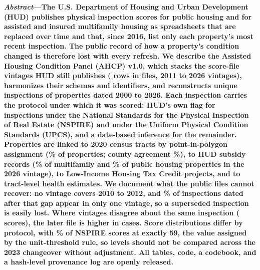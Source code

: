 \documentclass[10pt,twocolumn,letterpaper]{article}
\begin{document}

\begingroup
\renewcommand{\thefootnote}{}
\endgroup

\noindent\textbf{\textit{Abstract}---The U.S. Department of Housing and Urban Development (HUD) publishes physical inspection scores for public housing and for assisted and insured multifamily housing as spreadsheets that are replaced over time and that, since 2016, list only each property's most recent inspection. The public record of how a property's condition changed is therefore lost with every refresh. We describe the Assisted Housing Condition Panel (AHCP) v1.0, which stacks the \nVintages{} score-file vintages HUD still publishes (\SRawRows{} rows in \rawFiles{} files, 2011 to 2026 vintages), harmonizes their schemas and identifiers, and reconstructs \SInspections{} unique inspections of \SProperties{} properties dated 2000 to 2026. Each inspection carries the protocol under which it was scored: HUD's own flag for \SNspireHudFlag{} inspections under the National Standards for the Physical Inspection of Real Estate (NSPIRE) and \SUpcsHudFlag{} under the Uniform Physical Condition Standards (UPCS), and a date-based inference for the remainder. Properties are linked to 2020 census tracts by point-in-polygon assignment (\STractAssignedPct\% of properties; county agreement \STractCountyAgreePct\%), to HUD subsidy records (\SSubsidyLinkedCurrentMfPct\% of multifamily and \SSubsidyLinkedCurrentPhPct\% of public housing properties in the 2026 vintage), to Low-Income Housing Tax Credit projects, and to tract-level health estimates. We document what the public files cannot recover: no vintage covers 2010 to 2012, and \pctPostOneVintage\% of inspections dated after that gap appear in only one vintage, so a superseded inspection is easily lost. Where vintages disagree about the same inspection (\SScoreConflicts{} scores), the later file is higher in \scoreConfUp{} cases. Score distributions differ by protocol, with \nspirePctFiftyNine\% of NSPIRE scores at exactly 59, the value assigned by the unit-threshold rule, so levels should not be compared across the 2023 changeover without adjustment. All tables, code, a codebook, and a hash-level provenance log are openly released.}
\end{document}
